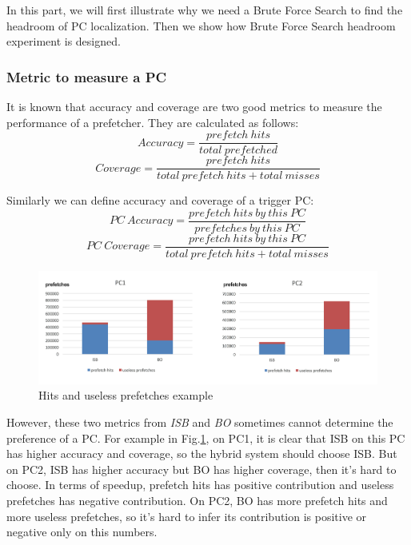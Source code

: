   In this part, we will first illustrate why we need a Brute Force Search to find the headroom of PC localization. Then we show how Brute Force Search headroom experiment is designed. \par

  \subsubsection{Metric to measure a PC}
  \label{sec:metricPC}

  It is known that accuracy and coverage are two good metrics \cite{yalepaper} to measure the performance of a prefetcher. They are calculated as follows:
  \begin{equation}
  Accuracy = \frac{prefetch\ hits}{total\  prefetched}
  \end{equation}
  \begin{equation}
  Coverage = \frac{prefetch\ hits}{total\ prefetch\ hits + total\ misses}
  \end{equation}

  Similarly we can define accuracy and coverage of a trigger PC:
  \begin{equation}
  PC\ Accuracy = \frac{prefetch\ hits\ by\ this\ PC}{prefetches\ by\ this\ PC}
  \end{equation}
  \begin{equation}
  PC\ Coverage = \frac{prefetch\ hits\ by\ this\ PC}{total\ prefetch\ hits + total\ misses}
 \end{equation}

 \begin{figure}[ht!]
	\centering
	\includegraphics[width=1.0\textwidth]{images/metric.png}
	\caption{Hits and useless prefetches example}
	\label{fig:pcmetric}
\end{figure}

However, these two metrics from \emph{ISB} and \emph{BO} sometimes cannot determine the preference of a PC.
For example in Fig.\ref{fig:pcmetric}, on PC1, it is clear that ISB on this PC has higher accuracy and coverage, so the hybrid system should choose ISB. But on PC2, ISB has higher accuracy but BO has higher coverage, then it's hard to choose.
In terms of speedup, prefetch hits has positive contribution and useless prefetches has negative contribution.
On PC2, BO has more prefetch hits and more useless prefetches, so it's hard to infer its contribution is positive or negative only on this numbers.

